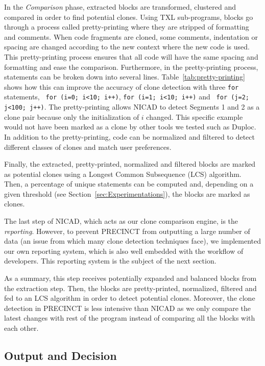 \documentclass[conference]{IEEEtran}
\begin{document}
In the \textit{Comparison} phase, extracted blocks are transformed, clustered and compared in order to find potential clones.
Using TXL sub-programs, blocks go through a process called pretty-printing where they are stripped of formatting and comments.
When code fragments are cloned, some comments, indentation or spacing are changed according to the new context where the new code is used. This pretty-printing process ensures that all code will have the same spacing and formatting and ease the comparison.
Furthermore, in the pretty-printing process, statements can be broken down into several lines.
Table~\ref{tab:pretty-printing} shows how this can improve the accuracy of clone detection with three \texttt{for} statements, \texttt{ for (i=0; i<10; i++)}, \texttt{for (i=1; i<10; i++)} and \texttt{ for (j=2; j<100; j++)}.
The pretty-printing allows NICAD to detect Segments 1 and 2 as a clone pair because only the initialization of $i$ changed.
This specific example would not have been marked as a clone by other  tools we tested such as Duploc\cite{Ducasse1999}.
In addition to the pretty-printing, code can be normalized and filtered to detect different classes of clones and match user preferences.



Finally, the extracted, pretty-printed, normalized and filtered blocks are marked as potential clones using a Longest Common Subsequence (LCS) algorithm\cite{Hunt1977}. Then, a percentage of unique statements can be computed and, depending on a given threshold (see Section~\ref{sec:Experimentations}), the blocks are marked as clones.

The last step of NICAD, which acts as our clone comparison engine, is the \textit{reporting}. However, to prevent PRECINCT from outputting  a large number of data (an issue from which many clone detection techniques face), we  implemented our own reporting system, which is also well embedded with the workflow of developers. This reporting system is the subject of the next section.

As a summary, this step receives potentially expanded and balanced blocks from the extraction step.
Then, the blocks are pretty-printed, normalized, filtered and fed to an LCS algorithm in order to detect potential clones.
Moreover, the clone detection in PRECINCT is less intensive than NICAD as we only compare the latest changes with rest of the program instead of comparing all the blocks with each other.

\subsection{Output and Decision}
\label{sub:Output and Decision}
\end{document}

